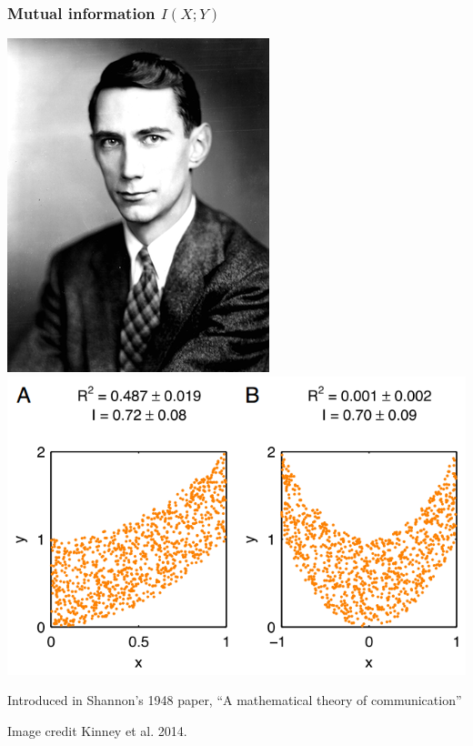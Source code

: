 \documentclass{beamer}
\begin{document}
\begin{frame}
\frametitle{Mutual information $I(X; Y)$}
\begin{center}
\includegraphics[scale = 0.23]{shannon_claude.png}
\hspace{0.2in}
\includegraphics[scale = 0.2]{kinney2.png}
\end{center}
Introduced in Shannon's 1948 paper, ``A mathematical theory of communication''

\vspace{1in}
\tiny{Image credit Kinney et al. 2014.}
\end{frame}
\end{document}
